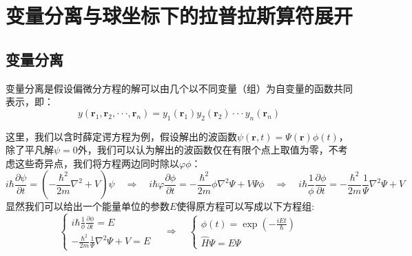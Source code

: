 \section{变量分离与球坐标下的拉普拉斯算符展开}
\subsection{变量分离}\label{sec:flbl}
变量分离是假设偏微分方程的解可以由几个以不同变量（组）为自变量的函数共同表示，即：
\[y(\bm{r}_1,\bm{r}_2,\cdot\cdot\cdot,\bm{r}_n)=y_1(\bm{r}_1)y_2(\bm{r}_2)\cdot\cdot\cdot y_n(\bm{r}_n)\]

这里，我们以含时薛定谔方程为例，假设解出的波函数$\psi(\bm{r},t)=\varPsi(\bm{r})\phi(t)$，除了平凡解$\psi=0$外，我们可以认为解出的波函数仅在有限个点上取值为零，不考虑这些奇异点，我们将方程两边同时除以$\varphi\phi$：
\[i \hbar \frac{\partial \psi}{\partial t}=\left (-\frac{\hbar^2}{2m}\nabla^2+V \right ) \psi \quad \Rightarrow \quad i \hbar \varphi \frac{\partial \phi}{\partial t}= -\frac{\hbar^2}{2m} \phi \nabla^2 \varPsi+V\varPsi\phi \quad \Rightarrow \quad i \hbar \frac{1}{\phi} \frac{\partial \phi}{\partial t}= -\frac{\hbar^2}{2m} \frac{1}{\varPsi} \nabla^2 \varPsi+V\]
显然我们可以给出一个能量单位的参数$E$使得原方程可以写成以下方程组:
\[\left\{
\begin{array}{r}
i\hbar\frac{1}{\phi}\frac{\partial\phi}{\partial t}=E\\
-\frac{\hbar^2}{2m}\frac{1}{\varPsi}\nabla^2\varPsi+V=E
\end{array} \right. \quad \Rightarrow \quad
\left\{
\begin{array}{l}
\phi(t)=\exp(-\frac{iEt}{\hbar})\\
\hat{H}\varPsi=E\varPsi
\end{array} \right.\]

